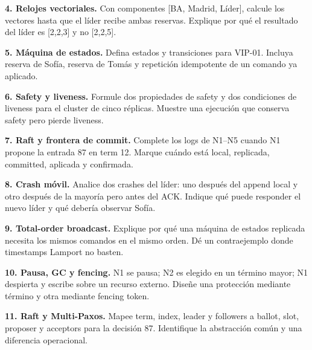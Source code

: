 \documentclass[variant=guia,cover=institutional,mode=screen]{ua-engineering-v6-article}
\begin{document}
\begin{uaexercise}
\textbf{4. Relojes vectoriales.} Con componentes [BA, Madrid, Líder], calcule los vectores hasta que el líder recibe ambas reservas. Explique por qué el resultado del líder es [2,2,3] y no [2,2,5].
\end{uaexercise}

\begin{uaexercise}
\textbf{5. Máquina de estados.} Defina estados y transiciones para VIP-01. Incluya reserva de Sofía, reserva de Tomás y repetición idempotente de un comando ya aplicado.
\end{uaexercise}

\begin{uaexercise}
\textbf{6. Safety y liveness.} Formule dos propiedades de safety y dos condiciones de liveness para el cluster de cinco réplicas. Muestre una ejecución que conserva safety pero pierde liveness.
\end{uaexercise}

\begin{uaexercise}
\textbf{7. Raft y frontera de commit.} Complete los logs de N1--N5 cuando N1 propone la entrada 87 en term 12. Marque cuándo está local, replicada, committed, aplicada y confirmada.
\end{uaexercise}

\begin{uaexercise}
\textbf{8. Crash móvil.} Analice dos crashes del líder: uno después del append local y otro después de la mayoría pero antes del ACK. Indique qué puede responder el nuevo líder y qué debería observar Sofía.
\end{uaexercise}

\begin{uaexercise}
\textbf{9. Total-order broadcast.} Explique por qué una máquina de estados replicada necesita los mismos comandos en el mismo orden. Dé un contraejemplo donde timestamps Lamport no basten.
\end{uaexercise}

\begin{uaexercise}
\textbf{10. Pausa, GC y fencing.} N1 se pausa; N2 es elegido en un término mayor; N1 despierta y escribe sobre un recurso externo. Diseñe una protección mediante término y otra mediante fencing token.
\end{uaexercise}

\begin{uaexercise}
\textbf{11. Raft y Multi-Paxos.} Mapee term, index, leader y followers a ballot, slot, proposer y acceptors para la decisión 87. Identifique la abstracción común y una diferencia operacional.
\end{uaexercise}
\end{document}
